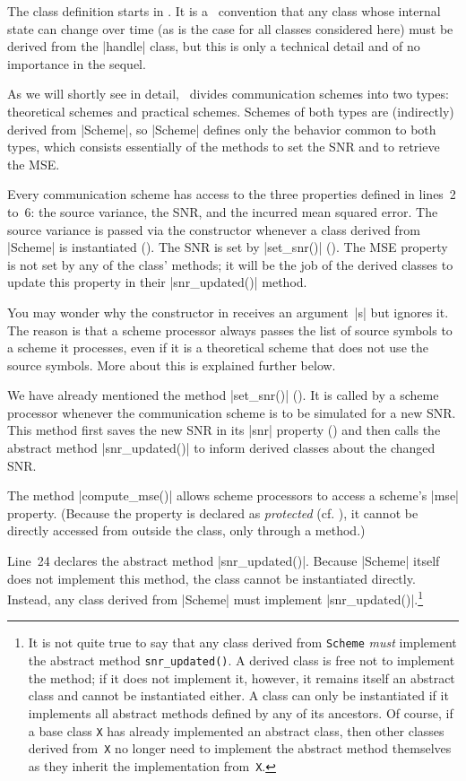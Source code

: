 The class definition starts in . It is a \matlab\ convention that any
class whose internal state can change over time (as is the case for all classes
considered here) must be derived from the |handle| class, but this is only a
technical detail and of no importance in the sequel.

As we will shortly see in detail, \jscsim\ divides communication schemes into
two types: theoretical schemes and practical schemes. Schemes of both
types are (indirectly) derived from |Scheme|, so |Scheme| defines only the
behavior common to both types, which consists essentially of the methods to set
the SNR and to retrieve the MSE. 

Every communication scheme has access to the three properties defined in
lines~2 to~6: the source variance, the SNR, and the incurred mean squared error.
The source variance is passed via the constructor whenever a class derived from
|Scheme| is instantiated (). The SNR is set by |set_snr()|
(). The MSE property is not set by any of the class' methods; it
will be the job of the derived classes to update this property in their
|snr_updated()| method. 

You may wonder why the constructor in  receives an argument~|s| but
ignores it. The reason is that a scheme processor always passes the list of
source symbols to a scheme it processes, even if it is a theoretical scheme that
does not use the source symbols. More about this is explained further below.

We have already mentioned the method |set_snr()| (). It is called by
a scheme processor whenever the communication scheme is to be simulated for a
new SNR. This method first saves the new SNR in its |snr| property
() and then calls the abstract method |snr_updated()| to inform
derived classes about the changed SNR.

The method |compute_mse()| allows scheme processors to access a scheme's
|mse| property. (Because the property is declared as \emph{protected} (cf.
), it cannot be directly accessed from outside the class, only
through a method.) 

Line~24 declares the abstract method |snr_updated()|. Because |Scheme| itself
does not implement this method, the class cannot be instantiated directly.
Instead, any class derived from |Scheme| must implement
|snr_updated()|.\footnote{It is not quite true to say that any class derived
from \texttt{Scheme} \emph{must} implement the abstract method
\texttt{snr\_updated()}. A derived class is free not to implement the method; if
it does not implement it, however, it remains itself an abstract class and
cannot be instantiated either. A class can only be instantiated if it implements
all abstract methods defined by any of its ancestors. Of course, if a base class
\texttt{X} has already implemented an abstract class, then other classes derived
from~\texttt{X} no longer need to implement the abstract method themselves as
they inherit the implementation from~\texttt{X}.}


